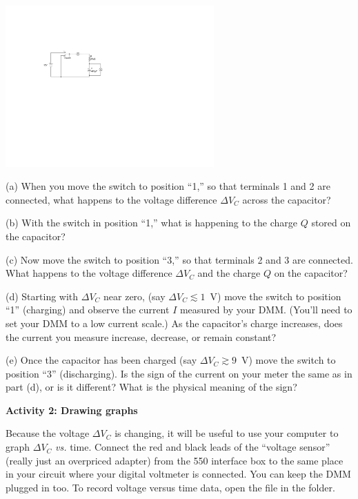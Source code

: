 \begin{center}
\vspace{-0.3 in}
\includegraphics[width=0.6\textwidth]{rc_circuits/single_dc_capacitor3.pdf}
\vspace{-0.1 in}
\end{center}

(a) When you move the switch to position ``1,'' so that terminals 1 and 2 are connected, what happens to the voltage difference $\Delta V_C$ across the capacitor?
\answerspace{0.6in}

(b)  With the switch in position ``1,'' what is happening to the charge $Q$ stored on the capacitor?
\answerspace{0.6in}

(c)  Now move the switch to position ``3,'' so that terminals 2 and 3 are connected.  What happens to the voltage difference $\Delta V_C$ and the charge $Q$ on the capacitor?
\answerspace{0.7in}

\pagebreak[2]
(d) Starting with $\Delta V_C$ near zero, (say $\Delta V_C \lesssim 1$~V) move the switch to position ``1'' (charging) and observe the current $I$ measured by your DMM.  (You'll need to set your DMM to a low current scale.)  As the capacitor's charge increases, does the current you measure increase, decrease, or remain constant?
\answerspace{0.5in}

(e) Once the capacitor has been charged (say $\Delta V_C \gtrsim 9$~V) move the switch to position ``3'' (discharging).  Is the sign of the current on your meter the same as in part (d), or is it different?  What is the physical meaning of the sign?
\answerspace{0.7in}

\textbf{Activity 2: Drawing graphs}

Because the voltage $\Delta V_C$ is changing, it will be useful to use your computer to graph $\Delta V_C$ \textit{vs.} time.  Connect the red and black leads of the ``voltage sensor'' (really just an overpriced adapter) from the 550 interface box to the same place in your circuit where your digital voltmeter is connected.  You can keep the DMM plugged in too.
To record voltage versus time data, open the file  in the \filename{\coursefolder} folder.

